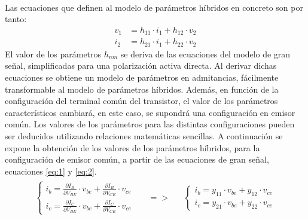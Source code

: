 \paragraph{}
Las ecuaciones que definen al modelo de par\'ametros híbridos en concreto son por tanto:
\begin{equation}
   \label{eq:hybred params}
\begin{aligned} 
   v_1 &= h_{11} \cdot i_1 + h_{12} \cdot v_2 \\
   i_2 &= h_{21} \cdot i_1 + h_{22} \cdot v_2
\end{aligned}
\end{equation}
El valor de los parámetros $h_{nm}$ se deriva de las ecuaciones del modelo de gran señal, simplificadas para una polarización activa directa.
Al derivar dichas ecuaciones se obtiene un modelo de parámetros en admitancias, fácilmente transformable al modelo de parámetros híbridos.
Además, en función de la configuración del terminal común del transistor, el valor de los parámetros característicos cambiará, en este caso, se supondrá una configuración en emisor común. Los valores de los parámetros para las distintas configuraciones pueden ser deducidos utilizando relaciones matemáticas sencillas.
A continuación se expone la obtención de los valores de los parámetros híbridos, para la configuración de emisor común, a partir de las ecuaciones de gran señal, ecuaciones \ref{eq:1} y \ref{eq:2}.
\[
\begin{array}{rcl} 
      \begin{array}{l}
	 \begin{cases}
	    i_b = \frac {\partial I_B}{\partial V_{BE}} \cdot v_{be} + \frac {\partial I_B}{\partial V_{CE}} \cdot v_{ce} \\
	    i_c = \frac {\partial I_C}{\partial V_{BE}} \cdot v_{be} + \frac {\partial I_C}{\partial V_{CE}} \cdot v_{ce} 
	 \end{cases}
      \end{array}
      &
      \begin{array}{l}
	  =>
      \end{array}
      &
      \begin{array}{l}
	 \begin{cases}
	 i_b = y_{11} \cdot v_{be} + y_{12} \cdot v_{ce} \\ 
	 i_c = y_{21} \cdot v_{be} + y_{22} \cdot v_{ce} 
	 \end{cases}
      \end{array}
\end{array}
\]
